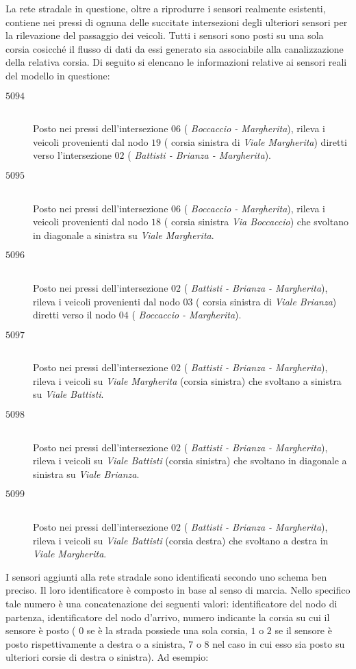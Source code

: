 La rete stradale in questione, oltre a riprodurre i sensori realmente esistenti, contiene nei pressi di ognuna delle succitate intersezioni degli ulteriori sensori per la rilevazione del passaggio dei veicoli. Tutti i sensori sono posti su una sola corsia cosicché il flusso di dati da essi generato sia associabile alla canalizzazione della relativa corsia. Di seguito si elencano le informazioni relative ai sensori reali del modello in questione:
\begin{description}
\item[$5094$] \hfill \\
Posto nei pressi dell'intersezione $06$ (\ie{} \emph{Boccaccio - Margherita}), rileva i veicoli provenienti dal nodo $19$ (\ie{} corsia sinistra di \emph{Viale Margherita}) diretti verso l'intersezione $02$ (\ie{} \emph{Battisti - Brianza - Margherita}).
\item[$5095$] \hfill \\
Posto nei pressi dell'intersezione $06$ (\ie{} \emph{Boccaccio - Margherita}), rileva i veicoli provenienti dal nodo $18$ (\ie{} corsia sinistra \emph{Via Boccaccio}) che svoltano in diagonale a sinistra su \emph{Viale Margherita}.
\item[$5096$] \hfill \\
Posto nei pressi dell'intersezione $02$ (\ie{} \emph{Battisti - Brianza - Margherita}), rileva i veicoli provenienti dal nodo $03$ (\ie{} corsia sinistra di \emph{Viale Brianza}) diretti verso il nodo $04$ (\ie{} \emph{Boccaccio - Margherita}).
\item[$5097$] \hfill \\
Posto nei pressi dell'intersezione $02$ (\ie{} \emph{Battisti - Brianza - Margherita}), rileva i veicoli su \emph{Viale Margherita} (corsia sinistra) che svoltano a sinistra su \emph{Viale Battisti}.
\item[$5098$] \hfill \\
Posto nei pressi dell'intersezione $02$ (\ie{} \emph{Battisti - Brianza - Margherita}), rileva i veicoli su \emph{Viale Battisti} (corsia sinistra) che svoltano in diagonale a sinistra su \emph{Viale Brianza}.
\item[$5099$] \hfill \\
Posto nei pressi dell'intersezione $02$ (\ie{} \emph{Battisti - Brianza - Margherita}), rileva i veicoli su \emph{Viale Battisti} (corsia destra) che svoltano a destra in \emph{Viale Margherita}.
\end{description}
I sensori aggiunti alla rete stradale sono identificati secondo uno schema ben preciso. Il loro identificatore è composto in base al senso di marcia. Nello specifico tale numero è una concatenazione dei seguenti valori: identificatore del nodo di partenza, identificatore del nodo d'arrivo, numero indicante la corsia su cui il sensore è posto (\ie{} $0$ se è la strada possiede una sola corsia, $1$ o $2$ se il sensore è posto rispettivamente a destra o a sinistra, $7$ o $8$ nel caso in cui esso sia posto su ulteriori corsie di destra o sinistra). Ad esempio:
